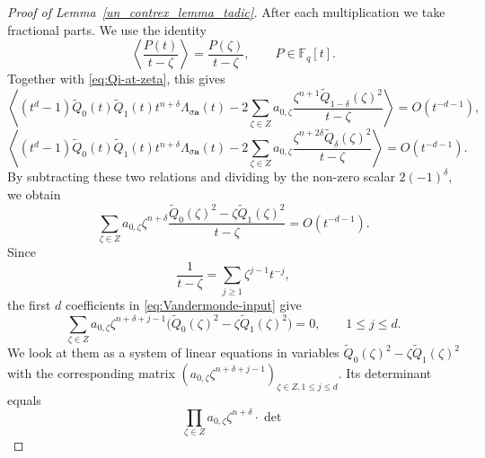 \documentclass[11pt]{article}
\theoremstyle{remark}
\begin{document}
\begin{proof}[Proof of Lemma~\ref{un_contrex_lemma_tadic}]
After each multiplication we take fractional parts.  We use the identity
\[
 \left\langle\frac{P(t)}{t-\zeta}\right\rangle
 =
 \frac{P(\zeta)}{t-\zeta},
 \qquad P\in\mathbb F_q[t].
\]
Together with \eqref{eq:Qi-at-zeta}, this gives
$$
\left\langle (t^d-1)\widetilde Q_0(t)\widetilde Q_1(t)
 t^{n+\delta}\Lambda_{\sigma\mathbf a}(t) - 2 \sum_{\zeta\in Z}
 a_{0,\zeta}
 \frac{\zeta^{n+1}\widetilde Q_{1-\delta}(\zeta)^2}
      {t-\zeta}\right\rangle = O(t^{-d-1}),
$$
$$
\left\langle (t^d-1)\widetilde Q_0(t)\widetilde Q_1(t)
 t^{n+\delta}\Lambda_{\sigma\mathbf a}(t) - 2\sum_{\zeta\in Z}
 a_{0,\zeta}
 \frac{\zeta^{n+2\delta}\widetilde Q_\delta(\zeta)^2}
      {t-\zeta}
 \right\rangle  =O(t^{-d-1}).
$$
%
By subtracting these two relations and dividing by the non-zero
scalar $2(-1)^\delta$, we obtain
\begin{equation} \label{eq:Vandermonde-input}
 \sum_{\zeta\in Z}
 a_{0,\zeta}\zeta^{n+\delta}
 \frac{\widetilde Q_0(\zeta)^2
       -\zeta\widetilde Q_1(\zeta)^2}
      {t-\zeta}
 =O(t^{-d-1}).
\end{equation}
Since
\[
 \frac1{t-\zeta}=\sum_{j\geq1}\zeta^{j-1}t^{-j},
\]
the first $d$ coefficients in \eqref{eq:Vandermonde-input} give
\begin{equation} \label{eq:Vandermonde-system}
 \sum_{\zeta\in Z}
 a_{0,\zeta}\zeta^{n+\delta+j-1}
 \bigl(\widetilde Q_0(\zeta)^2
       -\zeta\widetilde Q_1(\zeta)^2\bigr)=0,
 \qquad 1\leq j\leq d.
\end{equation}
We look at them as a system of linear equations in variables
$\widetilde{Q}_0(\zeta)^2 - \zeta\widetilde{Q}_1(\zeta)^2$ with the
corresponding matrix $(a_{0,\zeta}\zeta^{n+\delta+j-1})_{\zeta\in Z,
1\le j\le d}$. Its determinant equals
$$
\prod_{\zeta\in Z} a_{0,\zeta}\zeta^{n+\delta} \cdot \det
$$
\end{proof}
\end{document}
